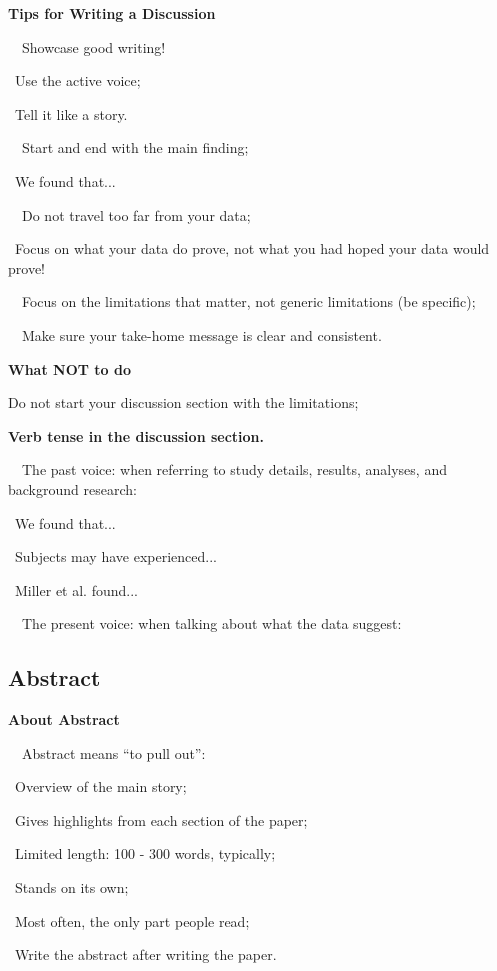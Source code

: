 \documentclass[a4paper, 12pt]{article}
\begin{document}
\newpage\textbf{Tips for Writing a Discussion}
\par\ \textbullet\ Showcase good writing!
\par\quad\textopenbullet\ Use the active voice;
\par\quad\textopenbullet\ Tell it like a story.
\par\ \textbullet\ Start and end with the main finding;
\par\quad\textopenbullet\ We found that...
\par\ \textbullet\ Do not travel too far from your data;
\par\quad\textopenbullet\ Focus on what your data do prove, not what you had hoped your data would prove!
\par\ \textbullet\ Focus on the limitations that matter, not generic limitations (be specific);
\par\ \textbullet\ Make sure your take-home message is clear and consistent.

\textbf{What NOT to do}
\par Do not start your discussion section with the limitations;

\textbf{Verb tense in the discussion section.}
\par\ \textbullet\ The past voice: when referring to study details, results, analyses, and background research:
\par\quad\textopenbullet\ We found that...
\par\quad\textopenbullet\ Subjects may have experienced...
\par\quad\textopenbullet\ Miller et al. found...
\par\ \textbullet\ The present voice: when talking about what the data suggest:

\newpage\subsection{Abstract}

\textbf{About Abstract}
\par\ \textbullet\ Abstract means ``to pull out'':
\par\quad\textopenbullet\ Overview of the main story;
\par\quad\textopenbullet\ Gives highlights from each section of the paper;
\par\quad\textopenbullet\ Limited length: 100 - 300 words, typically;
\par\quad\textopenbullet\ Stands on its own;
\par\quad\textopenbullet\ Most often, the only part people read;
\par\quad\textopenbullet\ Write the abstract after writing the paper.
\end{document}
